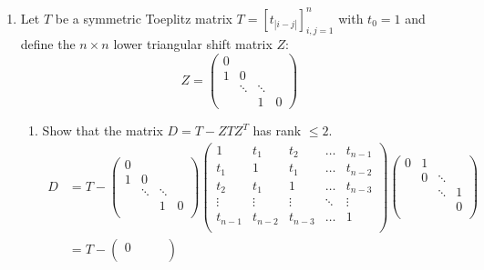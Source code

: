 \documentclass[11pt]{article}
\begin{document}
\begin{enumerate}
	\item Let \(T\) be a symmetric Toeplitz matrix \(T = [t_{|i-j|}]^n_{i,j=1}\) with \(t_0 = 1\) and define the \(n \times n\) lower triangular shift matrix \(Z\):
	      \[Z = \begin{pmatrix} 0 & & & \\ 1 & 0 & & \\ & \ddots & \ddots & \\ & & 1 & 0 \end{pmatrix}\]
	      \begin{enumerate}[label=(\alph*)]
		      \item Show that the matrix \(D = T - ZTZ^T\) has rank \(\leq 2\).
		            \begin{align*}
			            D & = T -
			            \begin{pmatrix}
				            0 &        &        &   \\
				            1 & 0      &        &   \\
				              & \ddots & \ddots &   \\
				              &        & 1      & 0 \\
			            \end{pmatrix}
			            \begin{pmatrix}
				            1       & t_1     & t_2     & \hdots & t_{n-1} \\
				            t_1     & 1       & t_1     & \hdots & t_{n-2} \\
				            t_2     & t_1     & 1       & \hdots & t_{n-3} \\
				            \vdots  & \vdots  & \vdots  & \ddots & \vdots  \\
				            t_{n-1} & t_{n-2} & t_{n-3} & \hdots & 1       \\
			            \end{pmatrix}
			            \begin{pmatrix}
				            0 & 1 &        &   \\
				              & 0 & \ddots &   \\
				              &   & \ddots & 1 \\
				              &   &        & 0 \\
			            \end{pmatrix}                            \\
			              & = T -
			            \begin{pmatrix}
				            0 &        &        &   \\

\end{pmatrix}
\end{align*}
\end{enumerate}
\end{enumerate}
\end{document}
